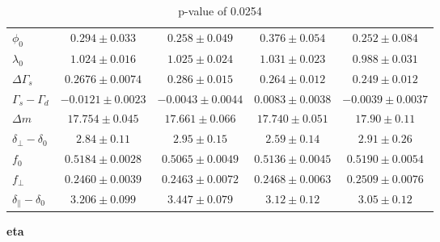\documentclass[aspectratio=43]{beamer}
\begin{document}
\begin{frame}
\begin{table}[H]
{\begin{tabular}{l|cccc}
\hline
$                        \phi_0$ & $     0.294 \pm 0.033$ & $     0.258 \pm 0.049$ & $     0.376 \pm 0.054$ & $     0.252 \pm 0.084$ \\
$                     \lambda_0$ & $     1.024 \pm 0.016$ & $     1.025 \pm 0.024$ & $     1.031 \pm 0.023$ & $     0.988 \pm 0.031$ \\
$                \Delta\Gamma_s$ & $   0.2676 \pm 0.0074$ & $     0.286 \pm 0.015$ & $     0.264 \pm 0.012$ & $     0.249 \pm 0.012$ \\
$           \Gamma_s - \Gamma_d$ & $  -0.0121 \pm 0.0023$ & $  -0.0043 \pm 0.0044$ & $   0.0083 \pm 0.0038$ & $  -0.0039 \pm 0.0037$ \\
$                      \Delta m$ & $    17.754 \pm 0.045$ & $    17.661 \pm 0.066$ & $    17.740 \pm 0.051$ & $      17.90 \pm 0.11$ \\
$     \delta_{\perp} - \delta_0$ & $       2.84 \pm 0.11$ & $       2.95 \pm 0.15$ & $       2.59 \pm 0.14$ & $       2.91 \pm 0.26$ \\
$                           f_0$ & $   0.5184 \pm 0.0028$ & $   0.5065 \pm 0.0049$ & $   0.5136 \pm 0.0045$ & $   0.5190 \pm 0.0054$ \\
$                     f_{\perp}$ & $   0.2460 \pm 0.0039$ & $   0.2463 \pm 0.0072$ & $   0.2468 \pm 0.0063$ & $   0.2509 \pm 0.0076$ \\
$ \delta_{\parallel} - \delta_0$ & $     3.206 \pm 0.099$ & $     3.447 \pm 0.079$ & $       3.12 \pm 0.12$ & $       3.05 \pm 0.12$ \\
\end{tabular}}
\caption{
p-value of 0.0254
}\end{table}
\newpage \textbf{ eta }
\begin{table}[H]
\end{table}
\end{frame}
\end{document}
